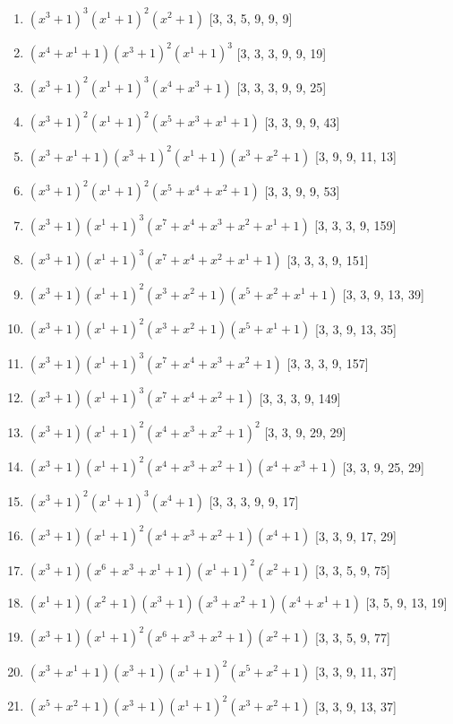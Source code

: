 \documentclass[10pt,twocolumn]{article}
\begin{document}
\begin{enumerate}
\item $(x^{3} + 1)^{3}(x^{1} + 1)^{2}(x^{2} + 1)$  [3, 3, 5, 9, 9, 9]
\item $(x^{4} + x^{1} + 1)(x^{3} + 1)^{2}(x^{1} + 1)^{3}$  [3, 3, 3, 9, 9, 19]
\item $(x^{3} + 1)^{2}(x^{1} + 1)^{3}(x^{4} + x^{3} + 1)$  [3, 3, 3, 9, 9, 25]
\item $(x^{3} + 1)^{2}(x^{1} + 1)^{2}(x^{5} + x^{3} + x^{1} + 1)$  [3, 3, 9, 9, 43]
\item $(x^{3} + x^{1} + 1)(x^{3} + 1)^{2}(x^{1} + 1)(x^{3} + x^{2} + 1)$  [3, 9, 9, 11, 13]
\item $(x^{3} + 1)^{2}(x^{1} + 1)^{2}(x^{5} + x^{4} + x^{2} + 1)$  [3, 3, 9, 9, 53]
\item $(x^{3} + 1)(x^{1} + 1)^{3}(x^{7} + x^{4} + x^{3} + x^{2} + x^{1} + 1)$  [3, 3, 3, 9, 159]
\item $(x^{3} + 1)(x^{1} + 1)^{3}(x^{7} + x^{4} + x^{2} + x^{1} + 1)$  [3, 3, 3, 9, 151]
\item $(x^{3} + 1)(x^{1} + 1)^{2}(x^{3} + x^{2} + 1)(x^{5} + x^{2} + x^{1} + 1)$  [3, 3, 9, 13, 39]
\item $(x^{3} + 1)(x^{1} + 1)^{2}(x^{3} + x^{2} + 1)(x^{5} + x^{1} + 1)$  [3, 3, 9, 13, 35]
\item $(x^{3} + 1)(x^{1} + 1)^{3}(x^{7} + x^{4} + x^{3} + x^{2} + 1)$  [3, 3, 3, 9, 157]
\item $(x^{3} + 1)(x^{1} + 1)^{3}(x^{7} + x^{4} + x^{2} + 1)$  [3, 3, 3, 9, 149]
\item $(x^{3} + 1)(x^{1} + 1)^{2}(x^{4} + x^{3} + x^{2} + 1)^{2}$  [3, 3, 9, 29, 29]
\item $(x^{3} + 1)(x^{1} + 1)^{2}(x^{4} + x^{3} + x^{2} + 1)(x^{4} + x^{3} + 1)$  [3, 3, 9, 25, 29]
\item $(x^{3} + 1)^{2}(x^{1} + 1)^{3}(x^{4} + 1)$  [3, 3, 3, 9, 9, 17]
\item $(x^{3} + 1)(x^{1} + 1)^{2}(x^{4} + x^{3} + x^{2} + 1)(x^{4} + 1)$  [3, 3, 9, 17, 29]
\item $(x^{3} + 1)(x^{6} + x^{3} + x^{1} + 1)(x^{1} + 1)^{2}(x^{2} + 1)$  [3, 3, 5, 9, 75]
\item $(x^{1} + 1)(x^{2} + 1)(x^{3} + 1)(x^{3} + x^{2} + 1)(x^{4} + x^{1} + 1)$  [3, 5, 9, 13, 19]
\item $(x^{3} + 1)(x^{1} + 1)^{2}(x^{6} + x^{3} + x^{2} + 1)(x^{2} + 1)$  [3, 3, 5, 9, 77]
\item $(x^{3} + x^{1} + 1)(x^{3} + 1)(x^{1} + 1)^{2}(x^{5} + x^{2} + 1)$  [3, 3, 9, 11, 37]
\item $(x^{5} + x^{2} + 1)(x^{3} + 1)(x^{1} + 1)^{2}(x^{3} + x^{2} + 1)$  [3, 3, 9, 13, 37]

\end{enumerate}
\end{document}
